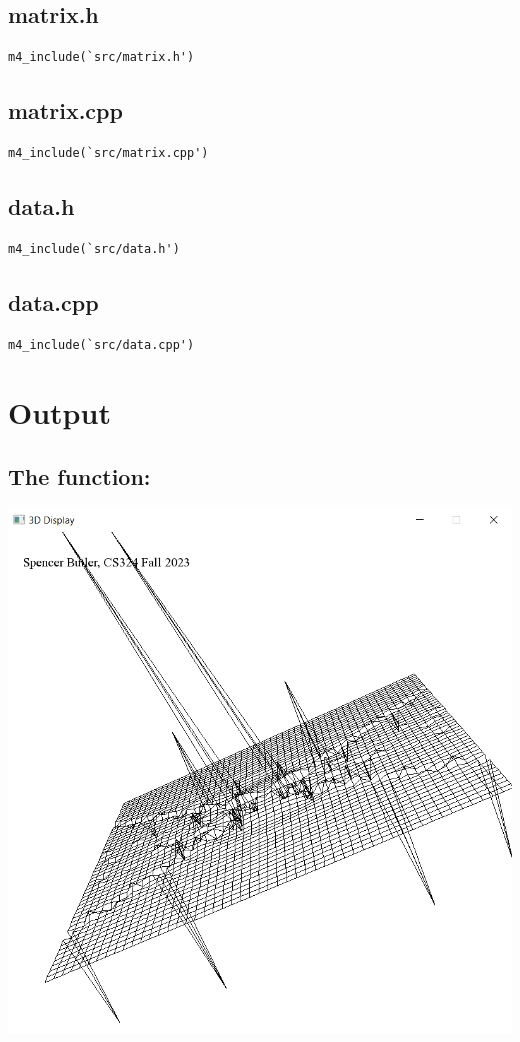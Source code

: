 \documentclass[12pt]{article}
\begin{document}
\subsection{matrix.h}
\begin{verbatim}
m4_include(`src/matrix.h')
\end{verbatim}
\subsection{matrix.cpp}
\begin{verbatim}
m4_include(`src/matrix.cpp')
\end{verbatim}

\subsection{data.h}
\begin{verbatim}
m4_include(`src/data.h')
\end{verbatim}
\subsection{data.cpp}
\begin{verbatim}
m4_include(`src/data.cpp')
\end{verbatim}

\section{Output}

\subsection{The function:}
\noindent \includegraphics{img/0}
\end{document}
